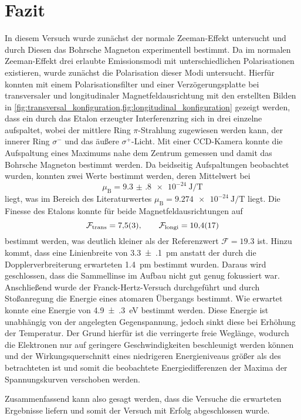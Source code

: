 \section{Fazit}\label{sec:fazit}
In diesem Versuch wurde zunächst der normale Zeeman-Effekt untersucht und durch Diesen 
das Bohrsche Magneton experimentell bestimmt. Da im normalen Zeeman-Effekt drei 
erlaubte Emissionsmodi mit unterschiedlichen Polarisationen existieren, 
wurde zunächst die Polarisation dieser Modi untersucht. Hierfür konnten mit 
einem Polarisationsfilter und einer Verzögerungsplatte bei transversaler und 
longitudinaler Magnetfeldausrichtung mit den erstellten Bilden in 
\cref{fig:transversal_konfiguration,fig:longitudinal_konfiguration}
gezeigt werden, dass ein durch das Etalon erzeugter Interferenzring sich in
drei einzelne aufspaltet, wobei der mittlere Ring $\pi$-Strahlung zugewiesen werden kann,
der innerer Ring $\sigma^-$ und das äußere $\sigma^+$-Licht.
Mit einer CCD-Kamera konnte die Aufspaltung eines Maximums nahe dem Zentrum gemessen und damit 
das Bohrsche Magneton bestimmt werden. Da beidseitig Aufspaltungen beobachtet wurden, konnten 
zwei Werte bestimmt werden, deren Mittelwert bei 
\begin{equation*}
    \mu_\mathrm B = \SI{9.3(8)e-24}{\joule\per\tesla}
\end{equation*}
liegt, was im Bereich des Literaturwertes $\mu_\mathrm B = \SI{9.274e-24}{\joule\per\tesla}$ liegt.
Die Finesse des Etalons konnte für beide Magnetfeldausrichtungen auf 
\[\mathcal F_\mathrm{trans} = \num{7.5\pm.3},\qquad \mathcal F_\mathrm{longi} = \num{10.4\pm1.7}\]
bestimmt werden, was deutlich kleiner als der Referenzwert $\mathcal F = \num{19.3}$ ist. Hinzu kommt, dass
eine Linienbreite von \SI{3.3(1)}{\pm} anstatt der durch die Dopplerverbreiterung erwarteten \SI{1.4}{\pm}
bestimmt wurden. Daraus wird geschlossen, dass die Sammellinse im Aufbau nicht gut genug fokussiert war.\\

Anschließend wurde der Franck-Hertz-Versuch durchgeführt und durch Stoßanregung die Energie 
eines atomaren Übergangs bestimmt. Wie erwartet konnte eine Energie von \SI{4.9(3)}{\electronvolt}
bestimmt werden. Diese Energie ist unabhängig von der angelegten Gegenspannung, jedoch sinkt diese 
bei Erhöhung der Temperatur. Der Grund hierfür ist die verringerte freie Weglänge, wodurch die 
Elektronen nur auf geringere Geschwindigkeiten beschleunigt werden können und der Wirkungsquerschnitt eines 
niedrigeren Energieniveaus größer als des betrachteten ist und somit die beobachtete Energiedifferenzen der Maxima
der Spannungskurven verschoben werden.

Zusammenfassend kann also gesagt werden, dass die Versuche die erwarteten Ergebnisse liefern und somit der 
Versuch mit Erfolg abgeschlossen wurde.

